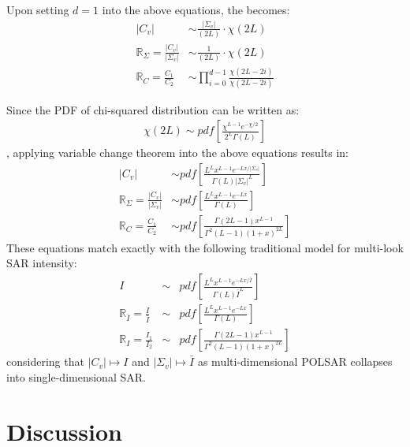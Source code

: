 \documentclass[journal]{IEEEtran}
\begin{document}
Upon setting $d=1$ into the above equations,
  the becomes:
\begin{align*}
  |C_v| &\sim  \frac{|\Sigma_v|}{(2L)} \cdot \chi (2L) \\ %
  \mathbb{R}_{\Sigma} = \frac{|C_v|}{|\Sigma_v|} &\sim \frac{1}{(2L)} \cdot \chi(2L) \\ %
\mathbb{R}_{C} = \frac{C_1}{C_2} &\sim \prod_{i=0}^{d-1} \frac{\chi(2L-2i)}{\chi(2L-2i)}
\end{align*}

Since the PDF of chi-squared distribution can be written as:
\begin{align*}
\chi(2L) \sim pdf \left[ \frac{\chi^{L-1}e^{-\chi/2}}{2^L\Gamma(L)} \right]
\end{align*}
, applying variable change theorem into the above equations results in:
\begin{align*}
  |C_v| &\sim  pdf \left[ \frac{L^L x^{L-1} e^{-Lx/|\Sigma_v|}}{\Gamma(L) |\Sigma_v|^L} \right] \\ %
  \mathbb{R}_{\Sigma} = \frac{|C_v|}{|\Sigma_v|} &\sim pdf \left[ \frac{ L^{L} x^{L-1} e^{-Lx}}{ \Gamma(L)} \right] \\ %
  \mathbb{R}_{C} = \frac{C_1}{C_2} &\sim pdf \left[ \frac{\Gamma(2L-1) x^{L-1}}{\Gamma^2(L-1) (1+x)^{2L}} \right]
\end{align*}
These equations match exactly with the following traditional model for multi-look SAR intensity:
  \begin{eqnarray}
I &\sim& pdf \left[ \frac{L^L x^{L-1} e^{-Lx/\bar{I}}}{\Gamma(L) \bar{I}^L} \right] \\
\mathbb{R}_{\bar{I}} = \frac{I}{\bar{I}} &\sim& pdf \left[ \frac{ L^{L} x^{L-1} e^{-Lx}}{ \Gamma(L)} \label{eqn:multi_look_SAR_ratio_dist} \right] \\
  \mathbb{R}_{I} = \frac{I_1}{I_2} &\sim& pdf \left[ \frac{\Gamma(2L-1) x^{L-1}}{\Gamma^2(L-1) (1+x)^{2L}} \right]
  \end{eqnarray}
considering that $|C_v| \mapsto I$ and $|\Sigma_v| \mapsto \bar{I}$ as multi-dimensional POLSAR collapses into single-dimensional SAR.

\section{Discussion}
\end{document}
